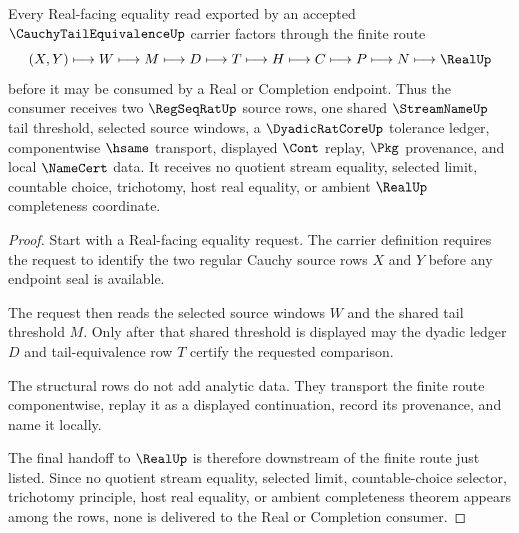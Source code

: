 \begin{theorem}
\label{thm:cauchy-tail-equivalence-real-seal-handoff}
Every Real-facing equality read exported by an accepted $\CauchyTailEquivalenceUp$ carrier factors through the finite route
$$
(X,Y)\longmapsto W\longmapsto M\longmapsto D\longmapsto T\longmapsto H\longmapsto C\longmapsto P\longmapsto N\longmapsto \RealUp
$$
before it may be consumed by a Real or Completion endpoint. Thus the consumer receives two $\RegSeqRatUp$ source rows, one shared $\StreamNameUp$ tail threshold, selected source windows, a $\DyadicRatCoreUp$ tolerance ledger, componentwise $\hsame$ transport, displayed $\Cont$ replay, $\Pkg$ provenance, and local $\NameCert$ data. It receives no quotient stream equality, selected limit, countable choice, trichotomy, host real equality, or ambient $\RealUp$ completeness coordinate.
\end{theorem}
\begin{proof}
Start with a Real-facing equality request. The carrier definition requires the request to identify the two regular Cauchy source rows $X$ and $Y$ before any endpoint seal is available.

The request then reads the selected source windows $W$ and the shared tail threshold $M$. Only after that shared threshold is displayed may the dyadic ledger $D$ and tail-equivalence row $T$ certify the requested comparison.

The structural rows do not add analytic data. They transport the finite route componentwise, replay it as a displayed continuation, record its provenance, and name it locally.

The final handoff to $\RealUp$ is therefore downstream of the finite route just listed. Since no quotient stream equality, selected limit, countable-choice selector, trichotomy principle, host real equality, or ambient completeness theorem appears among the rows, none is delivered to the Real or Completion consumer.
\end{proof}


